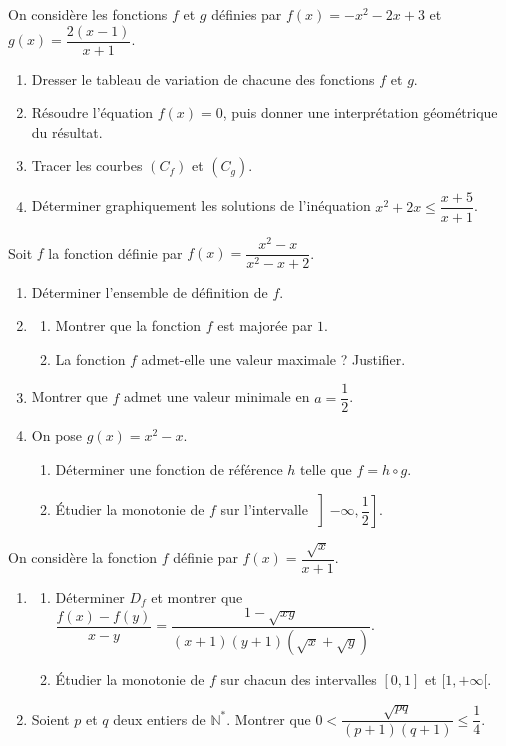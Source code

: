 On considère les fonctions $f$ et $g$ définies par $f(x)=-x^2-2x+3$ et $g(x)=\dfrac{2(x-1)}{x+1}$.
\begin{enumerate}
\item Dresser le tableau de variation de chacune des fonctions $f$ et $g$.
\item Résoudre l'équation $f(x)=0$, puis donner une interprétation géométrique du résultat.
\item Tracer les courbes $(C_f)$ et $(C_g)$.
\item Déterminer graphiquement les solutions de l'inéquation $x^2+2x\leq\dfrac{x+5}{x+1}$.
\end{enumerate}
\fin
{}
Soit $f$ la fonction définie par $f(x)=\dfrac{x^2-x}{x^2-x+2}$.
\begin{enumerate}
\item Déterminer l'ensemble de définition de $f$.
\item \begin{enumerate}
\item Montrer que la fonction $f$ est majorée par $1$.
\item La fonction $f$ admet-elle une valeur maximale ? Justifier.
\end{enumerate}
\item Montrer que $f$ admet une valeur minimale en $a=\dfrac12$.
\item On pose $g(x)=x^2-x$.
\begin{enumerate}
\item Déterminer une fonction de référence $h$ telle que $f=h\circ g$.
\item Étudier la monotonie de $f$ sur l'intervalle $\left]-\infty,\dfrac12\right]$.
\end{enumerate}
\end{enumerate}
\fin
{}
On considère la fonction $f$ définie par $f(x)=\dfrac{\sqrt x}{x+1}$.
\begin{enumerate}
\item \begin{enumerate}
\item Déterminer $D_f$ et montrer que $\dfrac{f(x)-f(y)}{x-y}=\dfrac{1-\sqrt{xy}}{(x+1)(y+1)\left(\sqrt x+\sqrt y\right)}$.
\item Étudier la monotonie de $f$ sur chacun des intervalles $[0,1]$ et $[1,+\infty[$.
\end{enumerate}
\item Soient $p$ et $q$ deux entiers de $\mathbb{N}^*$. Montrer que $0<\dfrac{\sqrt{pq}}{(p+1)(q+1)}\leq\dfrac14$.
\end{enumerate}
\fin
